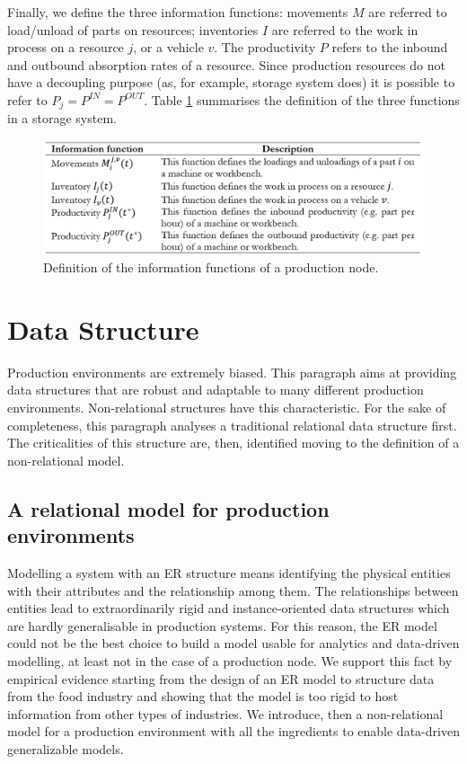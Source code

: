 Finally, we define the three information functions: movements $M$ are referred to load/unload of parts on resources; inventories $I$ are referred to the work in process on a resource $j$, or a vehicle $v$. The productivity $P$ refers to the inbound and outbound absorption rates of a resource. Since production resources do not have a decoupling purpose (as, for example, storage system does) it is possible to refer to $P_j=P^{IN}=P^{OUT}$. Table \ref{tab_information_framework_prod} summarises the definition of the three functions in a storage system.

\begin{figure}[hbt!]
\centering
\includegraphics[width=1\textwidth]{sectionProduction/diagnosticModels_figures/tab_information_framework_prod.png}
\captionsetup{type=table}
\caption{Definition of the information functions of a production node.}
\label{tab_information_framework_prod}
\end{figure}


\section{Data Structure} \label{secDataStructureProduction}
Production environments are extremely biased. This paragraph aims at providing data structures that are robust and adaptable to many different production environments. Non-relational structures have this characteristic. For the sake of completeness, this paragraph analyses a traditional relational data structure first. The criticalities of this structure are, then, identified moving to the definition of a non-relational model.

\subsection{A relational model for production environments} \label{secRelationalModelProduction}
Modelling a system with an ER structure means identifying the physical entities with their attributes and the relationship among them. The relationships between entities lead to extraordinarily rigid and instance-oriented data structures which are hardly generalisable in production systems. For this reason, the ER model could not be the best choice to build a model usable for analytics and data-driven modelling, at least not in the case of a production node. We support this fact by empirical evidence starting from the design of an ER model to structure data from the food industry and showing that the model is too rigid to host information from other types of industries. We introduce, then a non-relational model for a production environment with all the ingredients to enable data-driven generalizable models.\par

